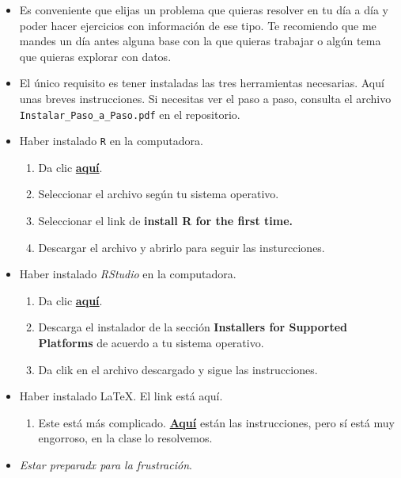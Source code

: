 \documentclass[]{article}
\providecommand{\tightlist}{%
  \setlength{\itemsep}{0pt}\setlength{\parskip}{0pt}}
\begin{document}
\begin{itemize}
\item
  Es conveniente que elijas un problema que quieras resolver en tu día a
  día y poder hacer ejercicios con información de ese tipo. Te
  recomiendo que me mandes un día antes alguna base con la que quieras
  trabajar o algún tema que quieras explorar con datos.
\item
  El único requisito es tener instaladas las tres herramientas
  necesarias. Aquí unas breves instrucciones. Si necesitas ver el paso a
  paso, consulta el archivo \texttt{Instalar\_Paso\_a\_Paso.pdf} en el
  repositorio.
\item
  Haber instalado \texttt{R} en la computadora.

  \begin{enumerate}
  \def\labelenumi{\arabic{enumi}.}
  \tightlist
  \item
    Da clic \href{https://cran.itam.mx/}{\textbf{aquí}}.
  \item
    Seleccionar el archivo según tu sistema operativo.
  \item
    Seleccionar el link de \textbf{install R for the first time.}
  \item
    Descargar el archivo y abrirlo para seguir las insturcciones.
  \end{enumerate}
\item
  Haber instalado \emph{RStudio} en la computadora.

  \begin{enumerate}
  \def\labelenumi{\arabic{enumi}.}
  \tightlist
  \item
    Da clic
    \href{https://www.rstudio.com/products/rstudio/download/\#download}{\textbf{aquí}}.
  \item
    Descarga el instalador de la sección \textbf{Installers for
    Supported Platforms} de acuerdo a tu sistema operativo.
  \item
    Da clik en el archivo descargado y sigue las instrucciones.
  \end{enumerate}
\item
  Haber instalado \LaTeX. El link está aquí.

  \begin{enumerate}
  \def\labelenumi{\arabic{enumi}.}
  \tightlist
  \item
    Este está más complicado.
    \href{https://www.latex-project.org/get/}{\textbf{Aquí}} están las
    instrucciones, pero sí está muy engorroso, en la clase lo
    resolvemos.
  \end{enumerate}
\item
  \emph{Estar preparadx para la frustración}.
\end{itemize}
\end{document}
